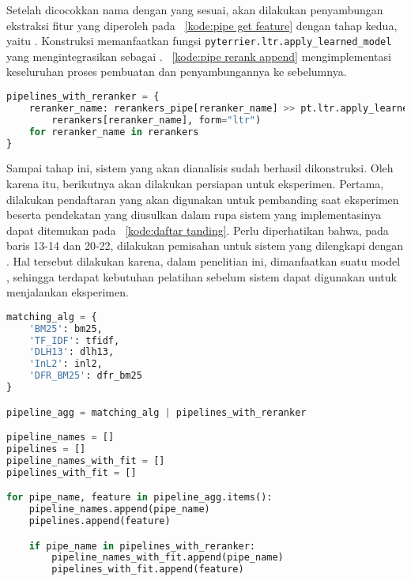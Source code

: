 Setelah dicocokkan nama dengan \pipeline{} yang sesuai, akan dilakukan penyambungan \pipeline{} ekstraksi fitur yang diperoleh pada \kode{}~\ref{kode:pipe get feature} dengan \pipeline{} tahap \ranking{} kedua, yaitu \pipeline{} \reranker{}. Konstruksi \pipeline{} \reranker{} memanfaatkan fungsi \lstinline{pyterrier.ltr.apply_learned_model} yang mengintegrasikan \lambdamart{} sebagai \pipeline{}. \kode{}~\ref{kode:pipe rerank append} mengimplementasi keseluruhan proses pembuatan \pipeline{} \reranker{} dan penyambungannya ke \pipeline{} sebelumnya.
\begin{lstlisting}[language=Python, caption={Pembuatan dan penyambungan \pipeline{} \reranker{}}, label={kode:pipe rerank append}]
pipelines_with_reranker = {
    reranker_name: rerankers_pipe[reranker_name] >> pt.ltr.apply_learned_model(
        rerankers[reranker_name], form="ltr")
    for reranker_name in rerankers
}\end{lstlisting}

Sampai tahap ini, sistem \ir{} yang akan dianalisis sudah berhasil dikonstruksi. Oleh karena itu, berikutnya akan dilakukan persiapan untuk eksperimen. Pertama, dilakukan pendaftaran \base{} \retriever{} yang akan digunakan untuk pembanding saat eksperimen beserta pendekatan yang diusulkan dalam rupa sistem \ir{} yang implementasinya dapat ditemukan pada \kode{}~\ref{kode:daftar tanding}. Perlu diperhatikan bahwa, pada baris 13-14 dan 20-22, dilakukan pemisahan untuk sistem yang dilengkapi dengan \reranker{}. Hal tersebut dilakukan karena, dalam penelitian ini, dimanfaatkan suatu model \ml{}, sehingga terdapat kebutuhan pelatihan sebelum sistem dapat digunakan untuk menjalankan eksperimen.
\begin{lstlisting}[language=Python, caption={Pendaftaran model untuk eksperimen}, label={kode:daftar tanding}]
matching_alg = {
    'BM25': bm25,
    'TF_IDF': tfidf,
    'DLH13': dlh13,
    'InL2': inl2,
    'DFR_BM25': dfr_bm25
}

pipeline_agg = matching_alg | pipelines_with_reranker

pipeline_names = []
pipelines = []
pipeline_names_with_fit = []
pipelines_with_fit = []

for pipe_name, feature in pipeline_agg.items():
    pipeline_names.append(pipe_name)
    pipelines.append(feature)

    if pipe_name in pipelines_with_reranker:
        pipeline_names_with_fit.append(pipe_name)
        pipelines_with_fit.append(feature)
\end{lstlisting}

